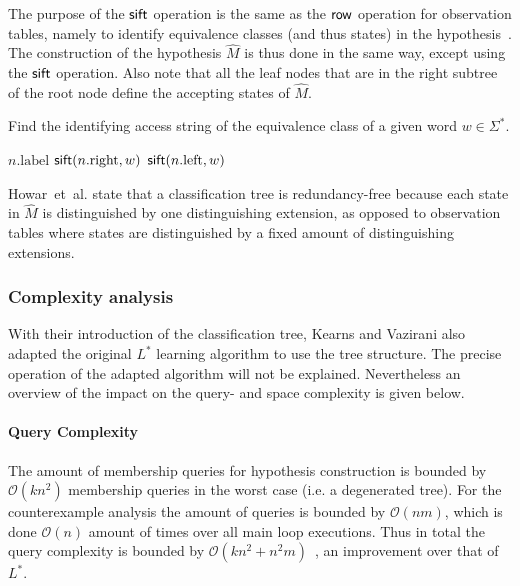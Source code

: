 The purpose of the $\mathsf{sift}$ operation is the same as the $\mathsf{row}$ operation for
observation tables, namely to identify equivalence classes (and thus states) in
the hypothesis~\cite{Kearns1994}. The construction of the hypothesis $\hat M$ is
thus done in the same way, except using the $\mathsf{sift}$ operation. Also note that
all the leaf nodes that are in the right subtree of the root node define the
accepting states of $\hat M$.

\begin{algorithm}[b]
  \caption{Find the identifying access string of the equivalence class of a
    given word $w \in \Sigma^*$.}
  \label{alg:sift}
  \begin{algorithmic}[1]
     
        \State\Return $n.\text{label}$
      \EndIf
        \State $\mathsf{sift}(n.\text{right},w)$
      \Else
        \State $\mathsf{sift}(n.\text{left},w)$
      \EndIf
    \EndFunction{}
  \end{algorithmic}
\end{algorithm}

Howar~et~al. state that a classification tree is redundancy-free because each
state in $\hat M$ is distinguished by one distinguishing extension, as opposed
to observation tables where states are distinguished by a fixed amount of
distinguishing extensions\cite{Howar2014}.

\subsubsection{Complexity analysis}
\label{sec:complexity-analysis}
With their introduction of the classification tree, Kearns and Vazirani also
adapted the original $L^*$ learning algorithm to use the tree
structure\cite{Kearns1994}. The precise operation of the adapted algorithm will
not be explained. Nevertheless an overview of the impact on the query- and space
complexity is given below.

\paragraph{Query Complexity} The amount of membership queries for hypothesis
construction is bounded by $\mathcal{O}(kn^2)$ membership queries in the worst
case (i.e. a degenerated tree)\cite{Howar2014,Kearns1994,Isberner2014b}. For the
counterexample analysis the amount of queries is bounded by $\mathcal{O}(nm)$,
which is done $\mathcal{O}(n)$ amount of times over all main loop
executions\cite{Kearns1994}. Thus in total the query complexity is bounded by
$\mathcal{O}(kn^2 + n^2m)$~\cite{Isberner2015a}, an improvement over that of
$L^*$.

